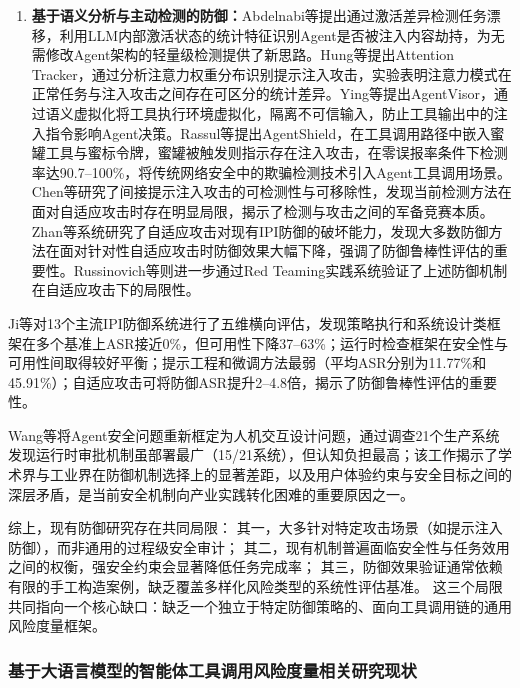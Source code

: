 \begin{enumerate}
  \item \textbf{基于语义分析与主动检测的防御：}Abdelnabi等\cite{abdelnabi2025drift}提出通过激活差异检测任务漂移，利用LLM内部激活状态的统计特征识别Agent是否被注入内容劫持，为无需修改Agent架构的轻量级检测提供了新思路。Hung等\cite{hung2025attention}提出Attention Tracker，通过分析注意力权重分布识别提示注入攻击，实验表明注意力模式在正常任务与注入攻击之间存在可区分的统计差异。Ying等\cite{ying2026agentvisor}提出AgentVisor，通过语义虚拟化将工具执行环境虚拟化，隔离不可信输入，防止工具输出中的注入指令影响Agent决策。Rassul等\cite{rassul2026agentshield}提出AgentShield，在工具调用路径中嵌入蜜罐工具与蜜标令牌，蜜罐被触发则指示存在注入攻击，在零误报率条件下检测率达90.7--100\%，将传统网络安全中的欺骗检测技术引入Agent工具调用场景。Chen等\cite{chen2025can}研究了间接提示注入攻击的可检测性与可移除性，发现当前检测方法在面对自适应攻击时存在明显局限，揭示了检测与攻击之间的军备竞赛本质。Zhan等\cite{zhan2025adaptive}系统研究了自适应攻击对现有IPI防御的破坏能力，发现大多数防御方法在面对针对性自适应攻击时防御效果大幅下降，强调了防御鲁棒性评估的重要性。Russinovich等\cite{russinovich2025great}则进一步通过Red Teaming实践系统验证了上述防御机制在自适应攻击下的局限性。
\end{enumerate}

Ji等\cite{ji2025taxonomy}对13个主流IPI防御系统进行了五维横向评估，发现策略执行和系统设计类框架在多个基准上ASR接近0\%，但可用性下降37--63\%；运行时检查框架在安全性与可用性间取得较好平衡；提示工程和微调方法最弱（平均ASR分别为11.77\%和45.91\%）；自适应攻击可将防御ASR提升2--4.8倍，揭示了防御鲁棒性评估的重要性。

Wang等\cite{wang2026reframing}将Agent安全问题重新框定为人机交互设计问题，通过调查21个生产系统发现运行时审批机制虽部署最广（15/21系统），但认知负担最高；该工作揭示了学术界与工业界在防御机制选择上的显著差距，以及用户体验约束与安全目标之间的深层矛盾，是当前安全机制向产业实践转化困难的重要原因之一。

综上，现有防御研究存在共同局限：
其一，大多针对特定攻击场景（如提示注入防御），而非通用的过程级安全审计；
其二，现有机制普遍面临安全性与任务效用之间的权衡，强安全约束会显著降低任务完成率；
其三，防御效果验证通常依赖有限的手工构造案例，缺乏覆盖多样化风险类型的系统性评估基准。
这三个局限共同指向一个核心缺口：缺乏一个独立于特定防御策略的、面向工具调用链的通用风险度量框架。

\subsubsection{基于大语言模型的智能体工具调用风险度量相关研究现状}

